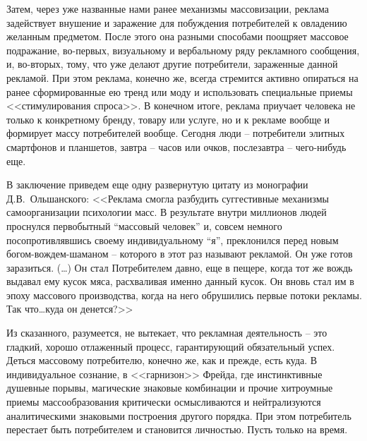 Затем, через уже названные нами ранее механизмы массовизации, реклама задействует
внушение и заражение для побуждения потребителей к овладению желанным предметом.
После этого она разными способами поощряет массовое подражание, во-первых,
визуальному и вербальному ряду рекламного сообщения, и, во-вторых, тому,
что уже делают другие потребители, зараженные данной рекламой. При этом реклама,
конечно же, всегда стремится активно опираться на ранее сформированные ею тренд или
моду и использовать специальные приемы <<стимулирования спроса>>. В конечном итоге,
реклама приучает человека не только к конкретному бренду, товару или услуге,
но и к рекламе вообще и формирует массу потребителей вообще. Сегодня люди --
потребители элитных смартфонов и планшетов, завтра -- часов или очков, послезавтра --
чего-нибудь еще.

В заключение приведем еще одну развернутую цитату из монографии Д.В.~Ольшанского:
<<Реклама смогла разбудить суггестивные механизмы самоорганизации психологии масс.
В результате внутри миллионов людей проснулся первобытный ``массовый человек'' и,
совсем немного посопротивлявшись своему индивидуальному ``я'', преклонился перед
новым богом-вождем-шаманом -- которого в этот раз называют рекламой. Он уже готов
заразиться. (\ldots) Он стал Потребителем давно, еще в пещере, когда тот же вождь
выдавал ему кусок мяса, расхваливая именно данный кусок. Он вновь стал им в эпоху
массового производства, когда на него обрушились первые потоки рекламы.
Так что\ldots куда он денется?>>\autocite[][321]{olshansky}

Из сказанного, разумеется, не вытекает, что рекламная деятельность -- это гладкий,
хорошо отлаженный процесс, гарантирующий обязательный успех. Деться массовому
потребителю, конечно же, как и прежде, есть куда. В индивидуальное сознание,
в <<гарнизон>> Фрейда, где инстинктивные душевные порывы, магические знаковые
комбинации и прочие хитроумные приемы массообразования критически осмысливаются и
нейтрализуются аналитическими знаковыми построения другого порядка.
При этом потребитель перестает быть потребителем и становится личностью.
Пусть только на время.

